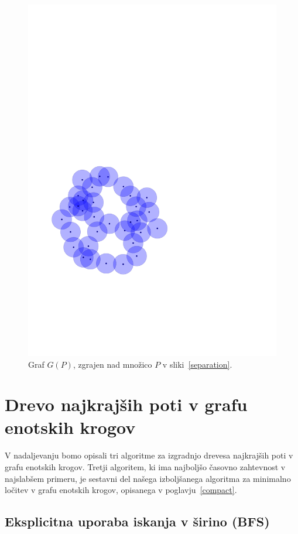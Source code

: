\documentclass[a4paper, 12pt]{book}
\begin{document}
\begin{figure}[htp]
\centerline{\includegraphics[scale=0.6,page=5]{pics/unitdisks.pdf}}
\caption{Graf $G(P)$, zgrajen nad množico $P$ v sliki~\ref{separation}.}
\label{gdisks}
\end{figure}

\section{Drevo najkrajših poti v grafu enotskih krogov}
V nadaljevanju bomo opisali tri algoritme za izgradnjo drevesa najkrajših poti v grafu enotskih krogov. Tretji algoritem, ki ima najboljšo časovno zahtevnost v najslabšem primeru, je sestavni del našega izboljšanega algoritma za minimalno ločitev v grafu enotskih krogov, opisanega v poglavju~\ref{compact}.

\subsection{Eksplicitna uporaba iskanja v širino (BFS)}
\label{bfs-theory}
\end{document}
